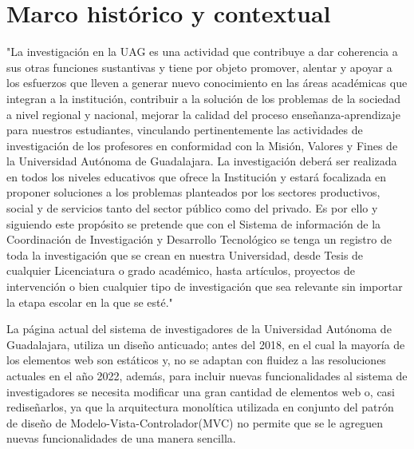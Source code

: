 
\section{Marco histórico y contextual}
    
    "La investigación en la UAG es una actividad que contribuye a dar coherencia a sus otras funciones sustantivas y tiene por objeto promover, alentar y apoyar a los esfuerzos que lleven a generar nuevo conocimiento en las áreas académicas que integran a la institución, contribuir a la solución de los problemas de la sociedad a nivel regional y nacional, mejorar la calidad del proceso enseñanza-aprendizaje para nuestros estudiantes, vinculando pertinentemente las actividades de investigación de los profesores en conformidad con la Misión, Valores y Fines de la Universidad Autónoma de Guadalajara.
    La investigación deberá ser realizada en todos los niveles educativos que ofrece la Institución y estará focalizada en proponer soluciones a los problemas planteados por los sectores productivos, social y de servicios tanto del sector público como del privado. Es por ello y siguiendo este propósito se pretende que con el Sistema de información de la Coordinación de Investigación y Desarrollo Tecnológico se tenga un registro de toda la investigación que se crean en nuestra Universidad, desde Tesis de cualquier Licenciatura o grado académico, hasta artículos, proyectos de intervención o bien cualquier tipo de investigación que sea relevante sin importar la etapa escolar en la que se esté."\cite{UAG}
    
    La página actual del sistema de investigadores de la Universidad Autónoma de Guadalajara, utiliza un diseño anticuado; antes del 2018, en el cual la mayoría de los elementos web son estáticos y, no se adaptan con fluidez a las resoluciones actuales en el año 2022, además, para incluir nuevas funcionalidades al sistema de investigadores se necesita modificar una gran cantidad de elementos web o, casi rediseñarlos, ya que la arquitectura monolítica utilizada en conjunto del patrón de diseño de Modelo-Vista-Controlador(MVC) no permite que se le agreguen nuevas funcionalidades de una manera sencilla.
    
